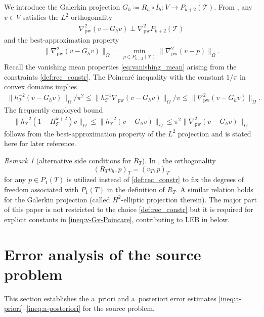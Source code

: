 \documentclass[a4paper]{amsart}
\numberwithin{equation}{section}
\def\T{\mathcal{T}}
\def\pw{\mathrm{pw}}
\theoremstyle{definition}
\theoremstyle{remark}
\newtheorem{remark}[theorem]{Remark}
\numberwithin{theorem}{section}
\numberwithin{equation}{section}
\numberwithin{table}{section}
\numberwithin{figure}{section}
\begin{document}
We introduce the Galerkin projection $G_h \coloneqq R_h \circ I_h : V \to P_{k+2}(\T)$. From , any $v \in V$ satisfies the $L^2$ orthogonality
\begin{align}\label{eq:commuting-G}
	\nabla_\pw^2(v - G_h v) \perp \nabla_\pw^2 P_{k+2}(\T)
\end{align}
and the best-approximation property
\begin{align}\label{eq:best-appr}
	\|\nabla_\pw^2(v - G_h v)\|_\Omega = \min_{p \in P_{k+2}(\T)} \|\nabla_\pw^2(v - p)\|_\Omega.
\end{align}
Recall the vanishing mean properties \eqref{eq:vanishing_mean} arising from the constraints \eqref{def:rec_constr}.
The Poincar\'e inequality with the constant $1/\pi$ in convex domains \cite{Bebendorf2003} implies
\begin{align}\label{ineq:v-Gv-Poincare}
	\|h_\T^{-2}(v - G_h v)\|_\Omega/\pi^2 \leq \|h_\T^{-1}\nabla_\pw(v - G_h v)\|_\Omega/\pi \leq \|\nabla_\pw^2(v - G_h v)\|_\Omega.
\end{align}
The frequently employed bound
\begin{align}\label{ineq:v-Piv}
	\|h_\T^{-2}(1 - \Pi_\T^{k+2}) v\|_\Omega \leq \|h_\T^{-2}(v - G_h v)\|_\Omega \leq \pi^2\|\nabla_\pw^2(v - G_h v)\|_\Omega
\end{align}
follows from the best-approximation property of the $L^2$ projection and is stated here for later reference.
\begin{remark}[alternative side conditions for $R_T$]
    In \cite{DongErn2022}, the orthogonality
    $$(R_T v_h, p)_T = (v_T,p)_T$$ for any $p \in P_1(T)$ is utilized instead of \eqref{def:rec_constr} to fix the degrees of freedom associated with $P_1(T)$ in the definition of $R_T$. A similar relation holds for the Galerkin projection (called $H^2$-elliptic projection therein). The major part of this paper is not restricted to the choice \eqref{def:rec_constr} but it is required for explicit constants in \eqref{ineq:v-Gv-Poincare}, contributing to LEB in  below.
\end{remark}

\section{Error analysis of the source problem}\label{sec:error-analysis}
This section establishes the a~priori and a~posteriori error estimates \eqref{ineq:a-priori}--\eqref{ineq:a-posteriori} for the source problem.
\end{document}
